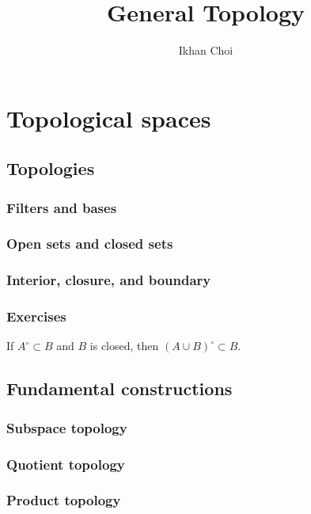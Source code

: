 \documentclass{../note}
\begin{document}
\title{General Topology}
\author{Ikhan Choi}
\maketitle
\tableofcontents

\part{Topological spaces}


\chapter{Topologies}

\section{Filters and bases}
\section{Open sets and closed sets}
\section{Interior, closure, and boundary}


\section*{Exercises}

\begin{prb}
If $A^\circ\subset B$ and $B$ is closed, then $(A\cup B)^\circ\subset B$.
\end{prb}




\chapter{Fundamental constructions}
\section{Subspace topology}
\section{Quotient topology}
\section{Product topology}
\end{document}
